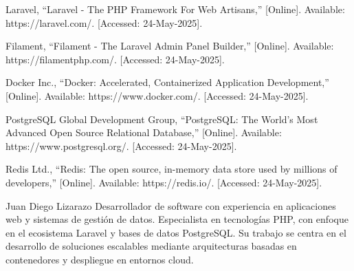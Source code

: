 \documentclass[journal]{IEEEtran}
\begin{document}

\ifCLASSOPTIONcaptionsoff
\newpage
\fi



%
%
%
\begin{thebibliography}{1}

  Laravel, ``Laravel - The PHP Framework For Web Artisans,'' [Online]. Available: https://laravel.com/. [Accessed: 24-May-2025].

  Filament, ``Filament - The Laravel Admin Panel Builder,'' [Online]. Available: https://filamentphp.com/. [Accessed: 24-May-2025].

  Docker Inc., ``Docker: Accelerated, Containerized Application Development,'' [Online]. Available: https://www.docker.com/. [Accessed: 24-May-2025].

  PostgreSQL Global Development Group, ``PostgreSQL: The World's Most Advanced Open Source Relational Database,'' [Online]. Available: https://www.postgresql.org/. [Accessed: 24-May-2025].

  Redis Ltd., ``Redis: The open source, in-memory data store used by millions of developers,'' [Online]. Available: https://redis.io/. [Accessed: 24-May-2025].

\end{thebibliography}

\begin{IEEEbiographynophoto}{Juan Diego Lizarazo}
  Desarrollador de software con experiencia en aplicaciones web y sistemas de gestión de datos. Especialista en tecnologías PHP, con enfoque en el ecosistema Laravel y bases de datos PostgreSQL. Su trabajo se centra en el desarrollo de soluciones escalables mediante arquitecturas basadas en contenedores y despliegue en entornos cloud.
\end{IEEEbiographynophoto}
\end{document}
